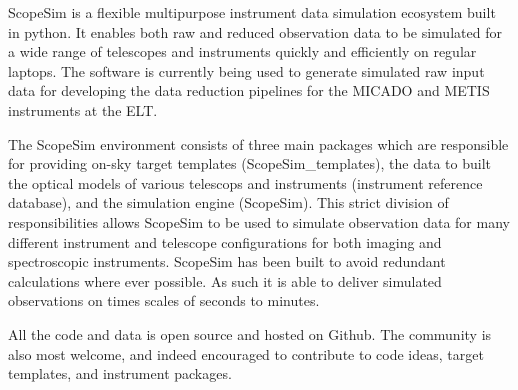 
ScopeSim is a flexible multipurpose instrument data simulation ecosystem built in python.
It enables both raw and reduced observation data to be simulated for a wide range of telescopes and instruments quickly and efficiently on regular laptops.
The software is currently being used to generate simulated raw input data for developing the data reduction pipelines for the MICADO and METIS instruments at the ELT.

The ScopeSim environment consists of three main packages which are responsible for providing on-sky target templates (ScopeSim\_templates), the data to built the optical models of various telescops and instruments (instrument reference database), and the simulation engine (ScopeSim).
This strict division of responsibilities allows ScopeSim to be used to simulate observation data for many different instrument and telescope configurations for both imaging and spectroscopic instruments.
ScopeSim has been built to avoid redundant calculations where ever possible.
As such it is able to deliver simulated observations on times scales of seconds to minutes.

All the code and data is open source and hosted on Github.
The community is also most welcome, and indeed encouraged to contribute to code ideas, target templates, and instrument packages.

